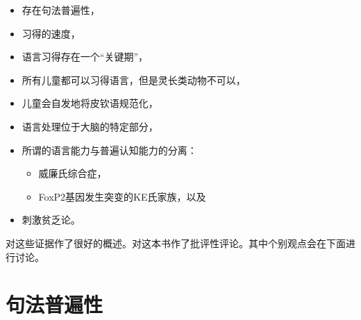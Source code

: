 \begin{itemize}
\item 存在句法普遍性，
\item 习得的速度，
\item 语言习得存在一个“关键期”，
\item 所有儿童都可以习得语言，但是灵长类动物不可以，
\item 儿童会自发地将皮钦语规范化，
\item 语言处理位于大脑的特定部分，
\item 所谓的语言能力与普遍认知能力的分离：
\begin{itemize}
\item 威廉氏综合症，
\item FoxP2基因发生突变的KE氏家族，以及
\end{itemize}
\item 刺激贫乏论。
\end{itemize}
\citet{Pinker94a} 对这些证据作了很好的概述。\citet{Tomasello95a}对这本书作了批评性评论。其中个别观点会在下面进行讨论。

\section{句法普遍性}
\label{sec-syntactic-universals}

